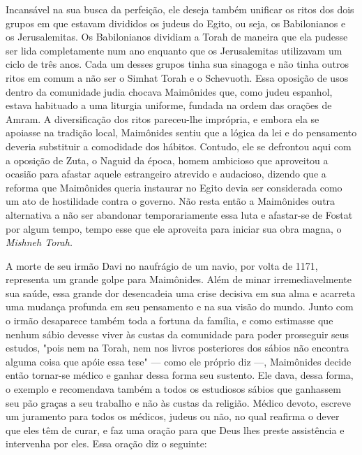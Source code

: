 \begin{itemize}
\begin{enumrate}
Incansável na sua busca da perfeição, ele deseja também unificar os
ritos dos dois grupos em que estavam divididos os judeus do Egito, ou
seja, os Babilonianos e os Jerusalemitas. Os Babilonianos dividiam a
Torah de ma­neira que ela pudesse ser lida completamente num ano
enquanto que os Jerusa­lemitas utilizavam um ciclo de três anos. Cada um
desses grupos tinha sua sina­goga e não tinha outros ritos em comum a
não ser o Simhat Torah e o Sche­vuoth. Essa oposição de usos dentro da
comunidade judia chocava Maimôni­des que, como judeu espanhol, estava
habituado a uma liturgia uniforme, fun­dada na ordem das orações de
Amram. A diversificação dos ritos pareceu-lhe imprópria, e embora ela se
apoiasse na tradição local, Maimônides sentiu que a lógica da lei e do
pensamento deveria substituir a comodidade dos hábitos. Contudo, ele se
defrontou aqui com a oposição de Zuta, o Naguid da época, homem
ambicioso que aproveitou a ocasião para afastar aquele estrangeiro
atre­vido e audacioso, dizendo que a reforma que Maimônides queria
instaurar no Egito devia ser considerada como um ato de hostilidade
contra o governo. Não resta então a Maimônides outra alternativa a não
ser abandonar temporariamente essa luta e afastar-se de Fostat por algum
tempo, tempo esse que ele aproveita para iniciar sua obra magna, o
\emph{Mishneh Torah.}

A morte de seu irmão Davi no naufrágio de um navio, por volta de 1171,
representa um grande golpe para Maimônides. Além de minar
irremedia­velmente sua saúde, essa grande dor desencadeia uma crise
decisiva em sua al­ma e acarreta uma mudança profunda em seu pensamento
e na sua visão do
mundo. Junto com o irmão desaparece também toda a fortuna da família, e
co­mo estimasse que nenhum sábio devesse viver às custas da comunidade
para poder prosseguir seus estudos, "pois nem na Torah, nem nos livros
posterio­res dos sábios não encontra alguma coisa que apóie essa tese"
--- como ele pró­prio diz ---, Maimônides decide então tornar-se médico
e ganhar dessa forma seu sustento. Ele dava, dessa forma, o exemplo e
recomendava também a to­dos os estudiosos sábios que ganhassem seu pão
graças a seu trabalho e não às custas da religião. Médico devoto,
escreve um juramento para todos os mé­dicos, judeus ou não, no qual
reafirma o dever que eles têm de curar, e faz uma oração para que Deus
lhes preste assistência e intervenha por eles. Essa oração diz o
seguinte:


\end{enumrate}
\end{itemize}
